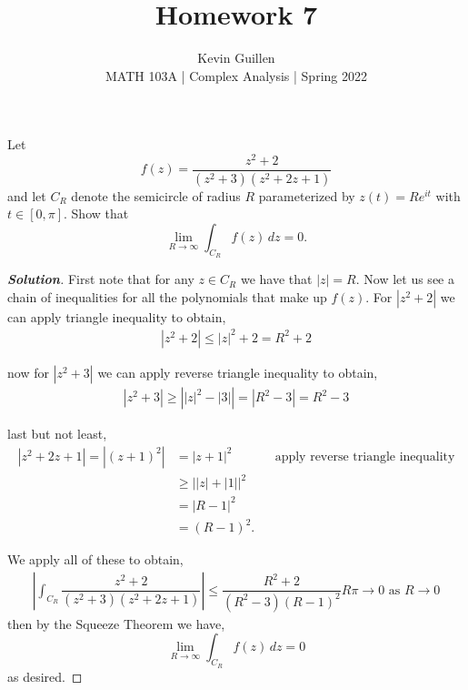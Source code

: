 \documentclass[11pt]{article}
\newenvironment{problem}[2][Problem\!]{\begin{trivlist}
\item[\hskip \labelsep {\bfseries #1}\hskip \labelsep {\bfseries #2}]}{\end{trivlist}}
\newenvironment{solution}{\begin{proof}[\textbf{\textit{Solution}}] }{\end{proof}}
\newcommand{\abs}[1]{\left\lvert#1\right\rvert} %
\renewcommand{\geq}{\geqslant}
\renewcommand{\leq}{\leqslant}
\begin{document}
 
\title{Homework 7}
\author{Kevin Guillen\\[0.5em]
MATH 103A | Complex Analysis | Spring 2022}
\date{} 
\maketitle


\begin{problem}{7.1}
Let 
\[f(z) = \frac{z^2+2}{(z^2+3)(z^2 + 2z + 1)}\]
and let $C_R$ denote the semicircle of radius $R$ parameterized by $z(t) = Re^{it}$ with $t \in [0,\pi]$. Show that
\[\lim_{R\to \infty} \int_{C_R}f(z) \, dz = 0.\]
\end{problem}
\begin{solution}
  First note that for any $z \in C_R$ we have that $\abs{z} = R$. Now let us see a chain of inequalities for all the polynomials that make up $f(z)$. For $\abs{z^{2} + 2}$ we can apply triangle inequality to obtain,
  \begin{align*}
    \abs{z^{2} + 2}  \leq \abs{z}^{2} + 2= R^{2} + 2
  \end{align*}

  now for $\abs{z^{2} + 3}$ we can apply reverse triangle inequality to obtain,
  \begin{align*}
    \abs{z^{2} + 3} \geq \abs{\abs{z}^{2} - \abs{3}} = \abs{R^{2} -3} = R^{2} -3
  \end{align*}

  last but not least,
  \begin{align*}
    \abs{z^{2} + 2z + 1} = \abs{(z + 1)^{2}} &= \abs{z + 1}^{2} && \text{apply reverse triangle inequality}  \\
    &\geq \abs{\abs{z} + \abs{1}}^{2} \\
    &= \abs{R - 1}^{2} \\
    &= (R-1)^{2}. 
  \end{align*}

  We apply all of these to obtain,
  \begin{align*}
    \abs{\int_{C_R} \dfrac{z^{2} + 2}{(z^{2} + 3)(z^{2} + 2z + 1)}} \leq \dfrac{R^{2} + 2}{(R^{2} - 3)(R-1)^{2}}R\pi \to 0 \text{ as } R \to 0
  \end{align*}
  then by the Squeeze Theorem we have,
  \[\lim_{R\to \infty} \int_{C_R}f(z) \, dz = 0\]
  as desired. 
\end{solution}
\end{document}
